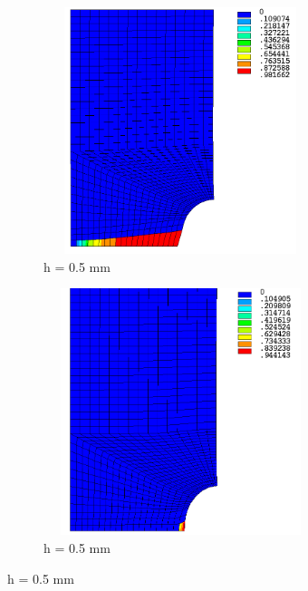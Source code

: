 \documentclass[12pt,openright,twoside]{report}
\begin{document}
\begin{figure}[htbp!]\ContinuedFloat 
     \begin{subfigure}{0.4\textwidth}
         \includegraphics[width=8cm,height=7.2cm,keepaspectratio]{25.d1-0.5-r.png}
         \caption{h = 0.5 mm}
         \label{fig:d1-0.5-r}
     \end{subfigure}   
     \hspace{1.8cm}
     \begin{subfigure}{0.4\textwidth}
         \includegraphics[width=8cm,height=7.2cm,keepaspectratio]{25.d1-0.5-nr.png}
         \caption{h = 0.5 mm}
         \label{fig:d1-0.5-nr}
     \end{subfigure}
\end{figure}
\FloatBarrier
\end{document}
